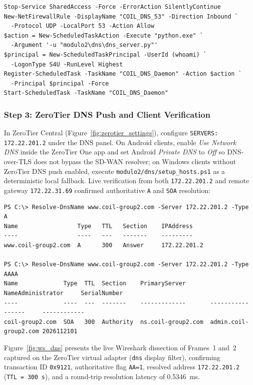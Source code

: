 \begin{lstlisting}[caption={Provisioning UDP port 53, firewall rules, and persistent S4U DNS daemon.},label={lst:manual4_service}]
Stop-Service SharedAccess -Force -ErrorAction SilentlyContinue
New-NetFirewallRule -DisplayName "COIL_DNS_53" -Direction Inbound `
  -Protocol UDP -LocalPort 53 -Action Allow
$action = New-ScheduledTaskAction -Execute "python.exe" `
  -Argument '-u "modulo2\dns\dns_server.py"'
$principal = New-ScheduledTaskPrincipal -UserId (whoami) `
  -LogonType S4U -RunLevel Highest
Register-ScheduledTask -TaskName "COIL_DNS_Daemon" -Action $action `
  -Principal $principal -Force
Start-ScheduledTask -TaskName "COIL_DNS_Daemon"
\end{lstlisting}

\subsubsection{Step 3: ZeroTier DNS Push and Client Verification}
In ZeroTier Central (Figure~\ref{fig:zerotier_settings}), configure \texttt{SERVERS: 172.22.201.2} under the DNS panel. On Android clients, enable \textit{Use Network DNS} inside the ZeroTier One app and set Android \textit{Private DNS} to \textit{Off} so DNS-over-TLS does not bypass the SD-WAN resolver; on Windows clients without ZeroTier DNS push enabled, execute \texttt{modulo2/dns/setup\_hosts.ps1} as a deterministic local fallback. Live verification from both \texttt{172.22.201.2} and remote gateway \texttt{172.22.31.69} confirmed authoritative \texttt{A} and \texttt{SOA} resolution:

\begin{lstlisting}[caption={Live authoritative DNS verification for Type A and Type AAAA queries.},label={lst:manual4_verify}]
PS C:\> Resolve-DnsName www.coil-group2.com -Server 172.22.201.2 -Type A
Name                 Type   TTL   Section    IPAddress
----                 ----   ---   -------    ---------
www.coil-group2.com  A      300   Answer     172.22.201.2

PS C:\> Resolve-DnsName www.coil-group2.com -Server 172.22.201.2 -Type AAAA
Name             Type  TTL  Section    PrimaryServer       NameAdministrator     SerialNumber
----             ----  ---  -------    -------------       -----------------     ------------
coil-group2.com  SOA   300  Authority  ns.coil-group2.com  admin.coil-group2.com 2026112101
\end{lstlisting}

Figure~\ref{fig:ws_dns} presents the live Wireshark dissection of Frames~1 and~2 captured on the ZeroTier virtual adapter (\texttt{dns} display filter), confirming transaction ID \texttt{0x9121}, authoritative flag \texttt{AA=1}, resolved address \texttt{172.22.201.2} (\texttt{TTL = 300 s}), and a round-trip resolution latency of \qty{0.5346}{\milli\second}.

